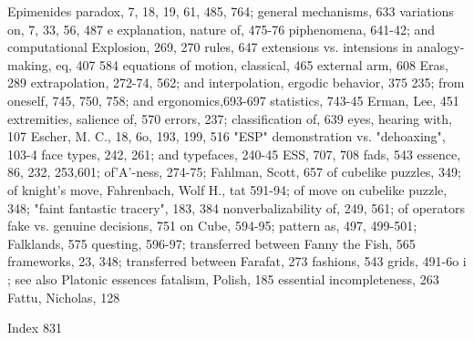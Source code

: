Epimenides paradox, 7, 18, 19, 61, 485, 764;       general mechanisms, 633
 variations on, 7, 33, 56, 487 e                  explanation, nature of, 475-76
piphenomena, 641-42; and computational            Explosion, 269, 270
 rules, 647                                       extensions vs. intensions in analogy-making,
eq, 407                                            584
equations of motion, classical, 465               external arm, 608
Eras, 289                                         extrapolation, 272-74, 562; and interpolation,
ergodic behavior, 375                              235; from oneself, 745, 750, 758; and
ergonomics,693-697                                 statistics, 743-45
Erman, Lee, 451                                   extremities, salience of, 570
errors, 237; classification of, 639               eyes, hearing with, 107
Escher, M. C., 18, 6o, 193, 199, 516
"ESP" demonstration vs. "dehoaxing", 103-4        face types, 242, 261; and typefaces, 240-45
ESS, 707, 708                                      fads, 543
essence, 86, 232, 253,601; of'A'-ness, 274-75;    Fahlman, Scott, 657
 of cubelike puzzles, 349; of knight's move,      Fahrenbach, Wolf H., tat
 591-94; of move on cubelike puzzle, 348;         "faint fantastic tracery", 183, 384
 nonverbalizability of, 249, 561; of operators    fake vs. genuine decisions, 751
 on Cube, 594-95; pattern as, 497, 499-501;       Falklands, 575
 questing, 596-97; transferred between            Fanny the Fish, 565
 frameworks, 23, 348; transferred between         Farafat, 273 fashions, 543
 grids, 491-6o i ; see also Platonic essences     fatalism, Polish, 185
essential incompleteness, 263                     Fattu, Nicholas, 128

 Index                                                                                      831

